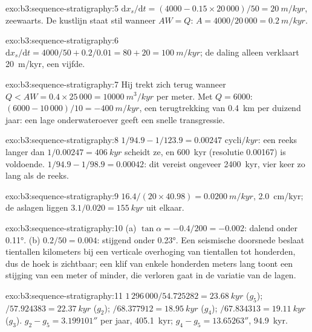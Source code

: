 \begin{solution}{exo:b3:sequence-stratigraphy:5}
$\mathrm dx_s/\mathrm dt = (4000 - 0.15\times20\,000)/50 = \qty{20}{m/kyr}$,
zeewaarts. De kustlijn staat stil wanneer $AW = Q$: $A = 4000/20\,000 =
\qty{0.2}{m/kyr}$.
\end{solution}

\begin{solution}{exo:b3:sequence-stratigraphy:6}
$\mathrm dx_s/\mathrm dt = 4000/50 + 0.2/0.01 = 80 + 20 = \qty{100}{m/kyr}$;
de daling alleen verklaart \qty{20}{m/kyr}, een vijfde.
\end{solution}

\begin{solution}{exo:b3:sequence-stratigraphy:7}
Hij trekt zich terug wanneer $Q < AW = 0.4\times25\,000 = \qty{10000}{m^3/kyr}$ per
meter. Met $Q = 6000$: $(6000 - 10\,000)/10 = \qty{-400}{m/kyr}$, een terugtrekking
van \qty{0.4}{km} per duizend jaar: een lage onderwateroever geeft een snelle
transgressie.
\end{solution}

\begin{solution}{exo:b3:sequence-stratigraphy:8}
$1/94.9 - 1/123.9 = \num{0.00247}\text{ cycli}/\unit{kyr}$: een reeks langer dan
$1/0.00247 = \qty{406}{kyr}$ scheidt ze, en \qty{600}{kyr} (resolutie
0.00167) is voldoende. $1/94.9 - 1/98.9 = 0.00042$: dit vereist ongeveer
\qty{2400}{kyr}, vier keer zo lang als de reeks.
\end{solution}

\begin{solution}{exo:b3:sequence-stratigraphy:9}
$16.4/(20\times40.98) = \qty{0.0200}{m/kyr}$, \qty{2.0}{cm/kyr}; de aslagen
liggen $3.1/0.020 = \qty{155}{kyr}$ uit elkaar.
\end{solution}

\begin{solution}{exo:b3:sequence-stratigraphy:10}
(a) $\tan\alpha = -0.4/200 = -0.002$: dalend onder \ang{0.11}. (b)
$0.2/50 = 0.004$: stijgend onder \ang{0.23}. Een seismische doorsnede beslaat tientallen
kilometers bij een verticale overhoging van tientallen tot honderden, dus de hoek is zichtbaar;
een klif van enkele honderden meters lang toont een stijging van een meter of minder, die verloren gaat in
de variatie van de lagen.
\end{solution}

\begin{solution}{exo:b3:sequence-stratigraphy:11}
$1\,296\,000/54.725282 = \qty{23.68}{kyr}$ ($g_5$); $/57.924383 =
\qty{22.37}{kyr}$ ($g_2$); $/68.377912 = \qty{18.95}{kyr}$ ($g_4$);
$/67.834313 = \qty{19.11}{kyr}$ ($g_3$). $g_2 - g_5 = 3.199101''$ per jaar,
\qty{405.1}{kyr}; $g_4 - g_5 = 13.65263''$, \qty{94.9}{kyr}.
\end{solution}

